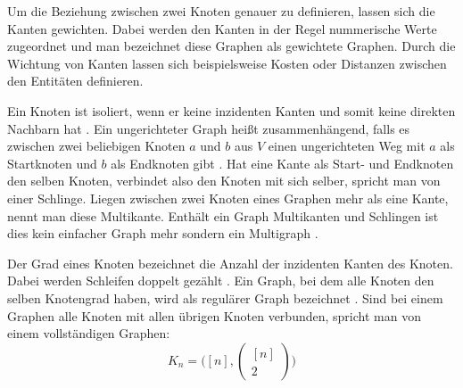 Um die Beziehung zwischen zwei Knoten genauer zu definieren, lassen sich die Kanten gewichten.
Dabei werden den Kanten in der Regel nummerische Werte zugeordnet und man bezeichnet diese Graphen als gewichtete Graphen.
Durch die Wichtung von Kanten lassen sich beispielsweise Kosten oder Distanzen zwischen den Entitäten definieren.

Ein Knoten ist isoliert, wenn er keine inzidenten Kanten und somit keine direkten Nachbarn hat \cite{knauer2015diskrete}.
Ein ungerichteter Graph heißt zusammenhängend, falls es zwischen zwei beliebigen Knoten $a$ und $b$ aus $V$ einen ungerichteten Weg mit $a$ als Startknoten und $b$ als Endknoten gibt \cite[36-38]{krumke2012graphentheoretische}.
Hat eine Kante als Start- und Endknoten den selben Knoten, verbindet also den Knoten mit sich selber, spricht man von einer Schlinge.
Liegen zwischen zwei Knoten eines Graphen mehr als eine Kante, nennt man diese Multikante.
Enthält ein Graph Multikanten und Schlingen ist dies kein einfacher Graph mehr sondern ein Multigraph \cite{felsner01}.

Der Grad eines Knoten bezeichnet die Anzahl der inzidenten Kanten des Knoten.
Dabei werden Schleifen doppelt gezählt \cite{rahm2017}.
Ein Graph, bei dem alle Knoten den selben Knotengrad haben, wird als regulärer Graph bezeichnet \cite{felsner2012geometric}.
Sind bei einem Graphen alle Knoten mit allen übrigen Knoten verbunden, spricht man von einem vollständigen Graphen:
\[K_{n}=\big([n],\begin{pmatrix}
					 [n] \\ 2
\end{pmatrix}\big)\]

